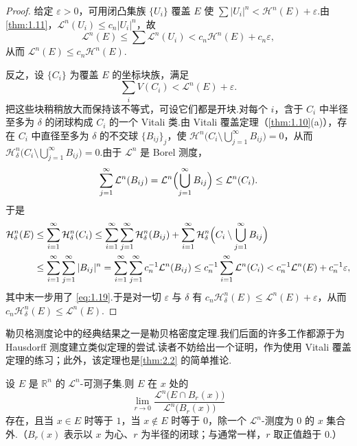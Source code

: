 \begin{proof}
给定 $\varepsilon>0$，可用闭凸集族 $\{U_i\}$ 覆盖 $E$ 使 $\sum|U_i|^n<\mathcal{H}^n(E)+\varepsilon$.由 \cref{thm:1.11}，$\mathcal{L}^n(U_i)\leq c_n|U_i|^n$，故
\[
  \mathcal{L}^n(E)\leq\sum\mathcal{L}^n(U_i)<c_n\mathcal{H}^n(E)+c_n\varepsilon,
\]
从而 $\mathcal{L}^n(E)\leq c_n\mathcal{H}^n(E)$.

反之，设 $\{C_i\}$ 为覆盖 $E$ 的坐标块族，满足
\begin{equation}\label{eq:1.19}
  \sum_{i}V(C_i)<\mathcal{L}^{n}(E)+\varepsilon.
\end{equation}
把这些块稍稍放大而保持该不等式，可设它们都是开块.对每个 $i$，含于 $C_i$ 中半径至多为 $\delta$ 的闭球构成 $C_i$ 的一个 Vitali 类.由 Vitali 覆盖定理（\cref{thm:1.10}(a)），存在 $C_i$ 中直径至多为 $\delta$ 的不交球 $\{B_{ij}\}_j$，使 $\mathcal{H}^n\bigl(C_i\setminus\bigcup_{j=1}^{\infty}B_{ij}\bigr)=0$，从而 $\mathcal{H}^n_{\delta}\bigl(C_i\setminus\bigcup_{j=1}^{\infty}B_{ij}\bigr)=0$.由于 $\mathcal{L}^n$ 是 Borel 测度，
\[
  \sum_{j=1}^{\infty}\mathcal{L}^n(B_{ij})=\mathcal{L}^n\Bigl(\bigcup_{j=1}^{\infty}B_{ij}\Bigr)\leq\mathcal{L}^n(C_i).
\]
于是
\[
\begin{aligned}
  \mathcal{H}^{n}_{\delta}(E)
    &\leq\sum_{i=1}^{\infty}\mathcal{H}^{n}_{\delta}(C_i)
     \leq\sum_{i=1}^{\infty}\sum_{j=1}^{\infty}\mathcal{H}^{n}_{\delta}(B_{ij})
      +\sum_{i=1}^{\infty}\mathcal{H}^{n}_{\delta}\Bigl(C_i\setminus\bigcup_{j=1}^{\infty}B_{ij}\Bigr)\\
    &\leq\sum_{i=1}^{\infty}\sum_{j=1}^{\infty}|B_{ij}|^{n}
     =\sum_{i=1}^{\infty}\sum_{j=1}^{\infty}c_n^{-1}\mathcal{L}^{n}(B_{ij})
     \leq c_n^{-1}\sum_{i=1}^{\infty}\mathcal{L}^{n}(C_i)
     <c_n^{-1}\mathcal{L}^{n}(E)+c_n^{-1}\varepsilon,
\end{aligned}
\]
其中末一步用了 \eqref{eq:1.19}.于是对一切 $\varepsilon$ 与 $\delta$ 有 $c_n\mathcal{H}^n_{\delta}(E)\leq\mathcal{L}^n(E)+\varepsilon$，从而 $c_n\mathcal{H}^n_{\delta}(E)\leq\mathcal{L}^n(E)$.
\end{proof}

勒贝格测度论中的经典结果之一是勒贝格密度定理.我们后面的许多工作都源于为 Hausdorff 测度建立类似定理的尝试.读者不妨给出一个证明，作为使用 Vitali 覆盖定理的练习；此外，该定理也是\cref{thm:2.2} 的简单推论.

\begin{theorem}\label{thm:1.13}
设 $E$ 是 $\mathbb{R}^n$ 的 $\mathcal{L}^n$-可测子集.则 $E$ 在 $x$ 处的
\begin{equation}\label{eq:1.20}
  \lim_{r\to 0}\frac{\mathcal{L}^{n}\bigl(E\cap B_r(x)\bigr)}{\mathcal{L}^{n}\bigl(B_r(x)\bigr)}
\end{equation}
存在，且当 $x\in E$ 时等于 $1$，当 $x\notin E$ 时等于 $0$，除一个 $\mathcal{L}^n$-测度为 $0$ 的 $x$ 集合外.（$B_r(x)$ 表示以 $x$ 为心、$r$ 为半径的闭球；与通常一样，$r$ 取正值趋于 $0$.）
\end{theorem}

